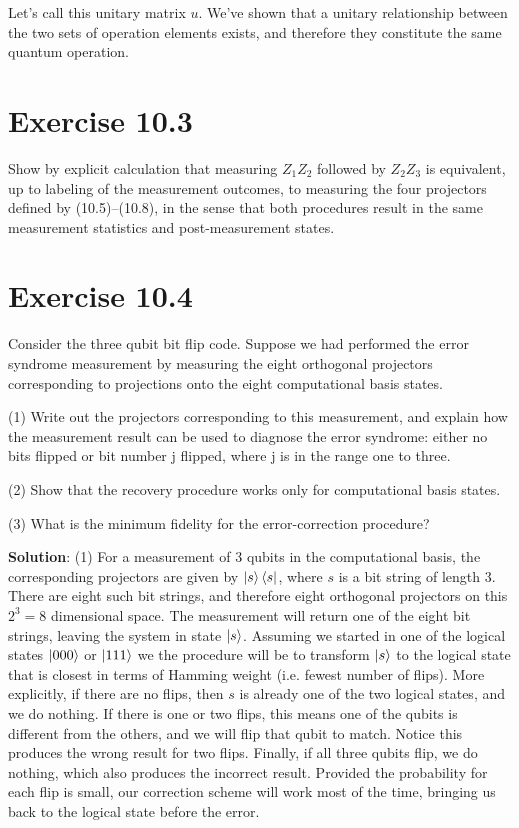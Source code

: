 \documentclass{book}
\begin{document}
    Let's call this unitary matrix $u$. We've shown that a unitary relationship between the two sets of operation elements exists, and therefore they constitute the same quantum operation. 
    
\section*{Exercise 10.3}
    Show by explicit calculation that measuring $Z_1 Z_2$ followed by $Z_2 Z_3$ is equivalent, up to labeling of the measurement outcomes, to measuring the four projectors defined by (10.5)–(10.8), in the sense that both procedures result in the same measurement statistics and post-measurement states.
    
\section*{Exercise 10.4}
    Consider the three qubit bit flip code. Suppose we had performed the error syndrome measurement by measuring the eight orthogonal projectors corresponding to projections onto the eight computational basis states.
    
    (1) Write out the projectors corresponding to this measurement, and explain how the measurement result can be used to diagnose the error syndrome: either no bits flipped or bit number j flipped, where j is in the range one to three.
    
    (2) Show that the recovery procedure works only for computational basis states.
    
    (3) What is the minimum fidelity for the error-correction procedure?
    
    \textbf{Solution}: (1) For a measurement of 3 qubits in the computational basis, the corresponding projectors are given by $\ket{s}\bra{s}$, where $s$ is a bit string of length 3. There are eight such bit strings, and therefore eight orthogonal projectors on this $2^3 = 8$ dimensional space. The measurement will return one of the eight bit strings, leaving the system in state $\ket{s}$. Assuming we started in one of the logical states $\ket{000}$ or $\ket{111}$ we the procedure will be to transform $\ket{s}$ to the logical state that is closest in terms of Hamming weight (i.e. fewest number of flips). More explicitly, if there are no flips, then $s$ is already one of the two logical states, and we do nothing. If there is one or two flips, this means one of the qubits is different from the others, and we will flip that qubit to match. Notice this produces the wrong result for two flips. Finally, if all three qubits flip, we do nothing, which also produces the incorrect result. Provided the probability for each flip is small, our correction scheme will work most of the time, bringing us back to the logical state before the error.
    
\end{document}
